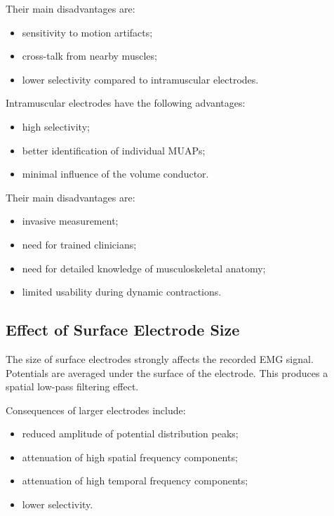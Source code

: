 Their main disadvantages are:

\begin{itemize}[noitemsep]
    \item sensitivity to motion artifacts;
    \item cross-talk from nearby muscles;
    \item lower selectivity compared to intramuscular electrodes.
\end{itemize}

Intramuscular electrodes have the following advantages:

\begin{itemize}[noitemsep]
    \item high selectivity;
    \item better identification of individual MUAPs;
    \item minimal influence of the volume conductor.
\end{itemize}

Their main disadvantages are:

\begin{itemize}[noitemsep]
    \item invasive measurement;
    \item need for trained clinicians;
    \item need for detailed knowledge of musculoskeletal anatomy;
    \item limited usability during dynamic contractions.
\end{itemize}

\subsection{Effect of Surface Electrode Size}

The size of surface electrodes strongly affects the recorded EMG signal. Potentials are averaged under the surface of the electrode. This produces a spatial low-pass filtering effect.

Consequences of larger electrodes include:

\begin{itemize}[noitemsep]
    \item reduced amplitude of potential distribution peaks;
    \item attenuation of high spatial frequency components;
    \item attenuation of high temporal frequency components;
    \item lower selectivity.
\end{itemize}

